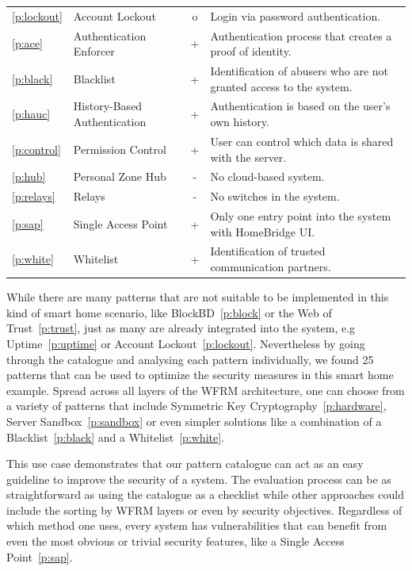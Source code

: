 \begin{landscape}
\begin{longtable}[c]{llcp{12cm}}
	\hline
	\ref{p:lockout} & Account Lockout & o & Login via password authentication. \\
	\ref{p:ace} & Authentication Enforcer & + & Authentication process that creates a proof of identity. \\
	\ref{p:black} & Blacklist & + & Identification of abusers who are not granted access to the system. \\
	\ref{p:hauc} & History-Based Authentication & + & Authentication is based on the user's own history. \\	
	\ref{p:control} & Permission Control & + & User can control which data is shared with the server. \\
	\ref{p:hub} & Personal Zone Hub & - & No cloud-based system. \\
	\ref{p:relays} & Relays & - & No switches in the system. \\
	\hline
	\ref{p:sap} & Single Access Point & + & Only one entry point into the system with HomeBridge UI. \\
	\ref{p:white} & Whitelist & + & Identification of trusted communication partners. \\
	\hline
\end{longtable}
\end{landscape}

While there are many patterns that are not suitable to be implemented in this kind of smart home scenario, like BlockBD~\ref{p:block} or the Web of Trust~\ref{p:trust}, just as many are already integrated into the system, e.g Uptime~\ref{p:uptime} or Account Lockout~\ref{p:lockout}. Nevertheless by going through the catalogue and analysing each pattern individually, we found 25 patterns that can be used to optimize the security measures in this smart home example. Spread across all layers of the WFRM architecture, one can choose from a variety of patterns that include Symmetric Key Cryptography~\ref{p:hardware}, Server Sandbox~\ref{p:sandbox} or even simpler solutions like a combination of a Blacklist~\ref{p:black} and a Whitelist~\ref{p:white}. 

This use case demonstrates that our pattern catalogue can act as an easy guideline to improve the security of a system. The evaluation process can be as straightforward as using the catalogue as a checklist while other approaches could include the sorting by WFRM layers or even by security objectives. Regardless of which method one uses, every system has vulnerabilities that can benefit from even the most obvious or trivial security features, like a Single Access Point~\ref{p:sap}.



 


